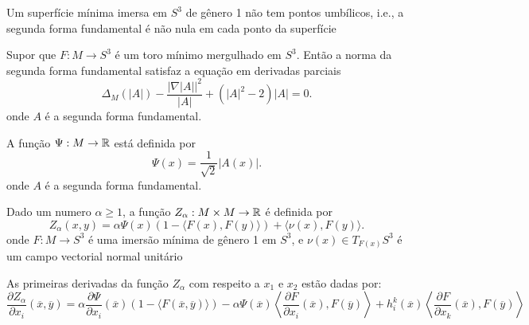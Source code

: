 \cite{Brendle2013}
\cite{Brendle2013a}

\begin{proposicao}
	Um superfície mínima imersa em $S^3$ de gênero 1 não tem pontos umbílicos, i.e., a segunda forma fundamental é não nula em cada ponto da superfície
\end{proposicao}

\begin{proposicao}
	Supor que $F: M \rightarrow S^3$ é um toro mínimo mergulhado em $S^3$. Então a norma da segunda forma fundamental satisfaz a equação em derivadas parciais
	\begin{equation*}
		\Delta_M (|A|) - \frac{| \nabla |A| |^2}{|A|} + (|A|^2 - 2) |A| = 0.
	\end{equation*}
	onde $A$ é a segunda forma fundamental.
\end{proposicao}

\begin{definicao}
	A função $\Psi: M \rightarrow \mathbb{R}$ está definida por
	\begin{equation*}
		\Psi(x) = \frac{1}{\sqrt{2}} |A(x)|.
	\end{equation*}
	onde $A$ é a segunda forma fundamental.
\end{definicao}

\begin{definicao}
	Dado um numero $\alpha \geq 1$, a função $Z_{\alpha}: M \times M \rightarrow \mathbb{R}$ é definida por
	\begin{equation*}
		Z_{\alpha}(x,y) = \alpha \Psi(x) (1 - \langle F(x), F(y) \rangle) + \langle \nu(x), F(y) \rangle.
	\end{equation*}
	onde $F: M \rightarrow S^3$ é uma imersão mínima de gênero 1 em $S^3$, e $\nu(x) \in T_{F(x)} S^3$ é um campo vectorial normal unitário
\end{definicao}

\begin{proposicao}
	As primeiras derivadas da função $Z_{\alpha}$ com respeito a $x_1$ e $x_2$ estão dadas por:
	\begin{equation*}
	\frac{\partial Z_{\alpha}}{\partial x_i} (\overline{x}, \overline{y}) = \alpha \frac{\partial \Psi}{\partial x_i}(\overline{x}) (1 - \langle F(\overline{x}, \overline{y}) \rangle) - \alpha \Psi(\overline{x}) \left\langle \frac{\partial F}{\partial x_i}(\overline{x}), F(\overline{y}) \right\rangle + h_i^k(\overline{x}) \left\langle \frac{\partial F}{\partial x_k}(\overline{x}), F(\overline{y}) \right\rangle
	\end{equation*}
\end{proposicao}


